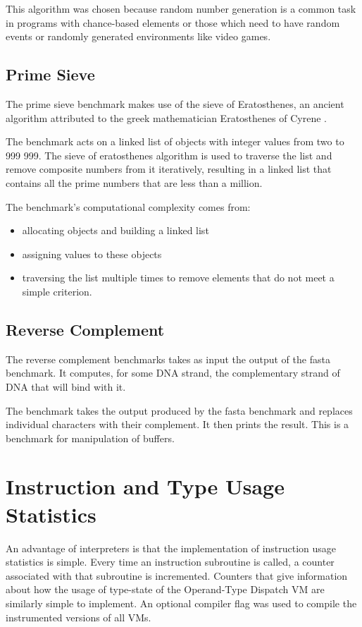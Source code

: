 \documentclass[english,a4paper,12pt]{report}
\begin{document}
This algorithm was chosen because random number generation is a common
task in programs with chance-based elements or those which need to
have random events or randomly generated environments like video
games.

\subsection{Prime Sieve}

The prime sieve benchmark makes use of the sieve of Eratosthenes, an
ancient algorithm attributed to the greek mathematician Eratosthenes
of Cyrene \cite{sieve}.

The benchmark acts on a linked list of objects with integer values
from two to 999 999. The sieve of eratosthenes algorithm is used to
traverse the list and remove composite numbers from it iteratively,
resulting in a linked list that contains all the prime numbers that
are less than a million.

The benchmark's computational complexity comes from:
\begin{itemize}
\item allocating objects and building a linked list
\item assigning values to these objects
\item traversing the list multiple times to remove elements that do
  not meet a simple criterion.
\end{itemize}
\subsection{Reverse Complement}

The reverse complement benchmarks takes as input the output of the
fasta benchmark. It computes, for some DNA strand, the complementary
strand of DNA that will bind with it. 

The benchmark takes the output produced by the fasta benchmark and
replaces individual characters with their complement. It then prints
the result. This is a benchmark for manipulation of buffers.

\section{Instruction and Type Usage Statistics}

An advantage of interpreters is that the implementation of instruction
usage statistics is simple. Every time an instruction subroutine is
called, a counter associated with that subroutine is
incremented. Counters that give information about how the usage of
type-state of the Operand-Type Dispatch VM are similarly simple to
implement. An optional compiler flag was used to compile the
instrumented versions of all VMs.
\end{document}
